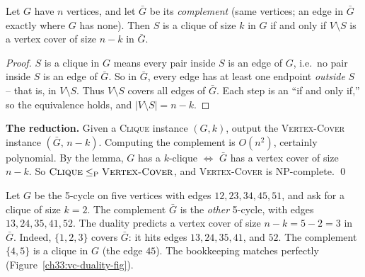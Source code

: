 \begin{lemma}
\label{ch33:vc-duality}
Let $G$ have $n$ vertices, and let $\bar G$ be its \emph{complement} (same
vertices; an edge in $\bar G$ exactly where $G$ has none). Then $S$ is a clique of
size $k$ in $G$ if and only if $V \setminus S$ is a vertex cover of size $n-k$ in
$\bar G$.
\end{lemma}
\begin{proof}
$S$ is a clique in $G$ means every pair inside $S$ is an edge of $G$, i.e.\ no pair
inside $S$ is an edge of $\bar G$. So in $\bar G$, every edge has at least one
endpoint \emph{outside} $S$ -- that is, in $V\setminus S$. Thus $V\setminus S$
covers all edges of $\bar G$. Each step is an ``if and only if,'' so the
equivalence holds, and $|V\setminus S| = n-k$.
\end{proof}

\textbf{The reduction.} Given a \textsc{Clique} instance $(G,k)$, output the
\textsc{Vertex-Cover} instance $(\bar G,\,n-k)$. Computing the complement is
$O(n^2)$, certainly polynomial. By the lemma, $G$ has a $k$-clique $\iff$ $\bar G$
has a vertex cover of size $n-k$. So $\textsc{Clique}\le_{\mathrm{P}}\textsc{Vertex-Cover}$,
and \textsc{Vertex-Cover} is NP-complete. \qed

\begin{example}
\label{ch33:vc-example}
Let $G$ be the 5-cycle on five vertices with edges $12, 23, 34, 45, 51$,
and ask for a clique of size $k=2$. The complement $\bar G$ is the
\emph{other} 5-cycle, with edges $13, 24, 35, 41, 52$. The duality predicts a vertex
cover of size $n-k=5-2=3$ in $\bar G$. Indeed, $\{1, 2, 3\}$ covers $\bar G$: it hits edges $13, 24, 35, 41$, and $52$.
The complement $\{4,5\}$ is a clique in $G$ (the edge $45$).
The bookkeeping matches perfectly (Figure~\ref{ch33:vc-duality-fig}).
\end{example}

